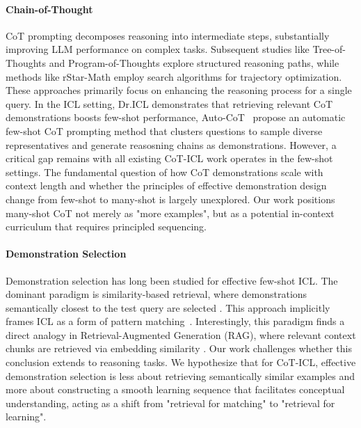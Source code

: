 \documentclass{llmxive}
\begin{document}
\paragraph{Chain-of-Thought}
CoT prompting \cite{wei2022chain} decomposes reasoning into intermediate steps, substantially improving LLM performance on complex tasks. Subsequent studies like Tree-of-Thoughts \cite{tot} and Program-of-Thoughts \cite{pot} explore structured reasoning paths, while methods like rStar-Math \cite{guan2025rstar} employ search algorithms for trajectory optimization. These approaches primarily focus on enhancing the reasoning process for a single query. In the ICL setting, Dr.ICL \cite{dricl} demonstrates that retrieving relevant CoT demonstrations boosts few-shot performance, Auto-CoT~\cite{zhang2022automaticchainthoughtprompting} propose an automatic few-shot CoT prompting method that clusters questions to sample diverse representatives and generate reasosning chains as demonstrations. However, a critical gap remains with all existing CoT-ICL work operates in the few-shot settings. The fundamental question of how CoT demonstrations scale with context length and whether the principles of effective demonstration design change from few-shot to many-shot is largely unexplored. Our work positions many-shot CoT not merely as "more examples", but as a potential in-context curriculum that requires principled sequencing.

\paragraph{Demonstration Selection}
Demonstration selection has long been studied for effective few-shot ICL. The dominant paradigm is similarity-based retrieval, where demonstrations semantically closest to the test query are selected \cite{liu-etal-2022-makes, wu-etal-2023-self, kapuriya2025exploringrolediversityexample}. This approach implicitly frames ICL as a form of pattern matching~\cite{olsson2022incontextlearninginductionheads, crosbie-shutova-2025-induction, yu-etal-2025-stochastic}. Interestingly, this paradigm finds a direct analogy in Retrieval-Augmented Generation (RAG), where relevant context chunks are retrieved via embedding similarity \cite{lewis2020retrieval}. Our work challenges whether this conclusion extends to reasoning tasks. We hypothesize that for CoT-ICL, effective demonstration selection is less about retrieving semantically similar examples and more about constructing a smooth learning sequence that facilitates conceptual understanding, acting as a shift from "retrieval for matching" to "retrieval for learning".
\end{document}
